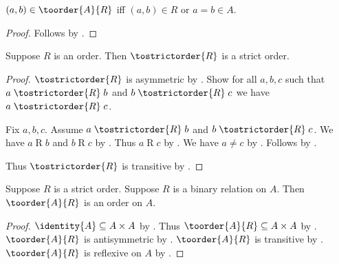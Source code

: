 \begin{proposition}\label{toorder_iff}
    $(a,b)\in\toorder{A}{R}$ iff $(a,b)\in R$ or $a = b\in A$.
\end{proposition}
\begin{proof}
    Follows by .
\end{proof}

\begin{proposition}\label{strictorder_from_order}
    Suppose $R$ is an order.
    Then $\tostrictorder{R}$ is a strict order.
\end{proposition}
\begin{proof}
    $\tostrictorder{R}$ is asymmetric
        by .
    Show for all $a,b,c$ such that
        $a\mathrel{\tostrictorder{R}}b$ and
        $b\mathrel{\tostrictorder{R}}c$
        we have $a\mathrel{\tostrictorder{R}}c$.
    \begin{subproof}
        Fix $a,b,c$.
        Assume $a\mathrel{\tostrictorder{R}}b$ and
            $b\mathrel{\tostrictorder{R}}c$.
        We have $a\mathrel{R}b$ and $b\mathrel{R}c$
            by .
        Thus $a\mathrel{R}c$ by .
        We have $a\neq c$ by .
        Follows by .
    \end{subproof}
    Thus $\tostrictorder{R}$ is transitive by .
\end{proof}

\begin{proposition}\label{order_from_strictorder}
    Suppose $R$ is a strict order.
    Suppose $R$ is a binary relation on $A$.
    Then $\toorder{A}{R}$ is an order on $A$.
\end{proposition}
\begin{proof}
    $\identity{A}\subseteq A\times A$
        by .
    Thus $\toorder{A}{R}\subseteq A\times A$
        by .
    $\toorder{A}{R}$ is antisymmetric
        by .
    $\toorder{A}{R}$ is transitive by .
    $\toorder{A}{R}$ is reflexive on $A$ by .
\end{proof}

